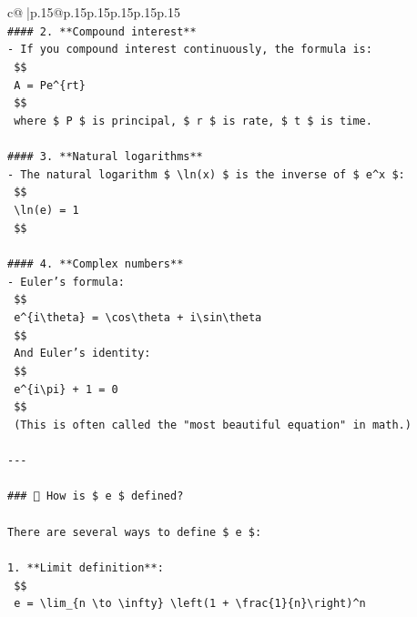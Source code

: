 \documentclass{article}
\begin{document}
{\begin{supertabular}{c@{$\;$}|p{.15\linewidth}@{}p{.15\linewidth}p{.15\linewidth}p{.15\linewidth}p{.15\linewidth}p{.15\linewidth}}
{{{\\ 
\texttt{\#\#\#\# 2. **Compound interest**} \\
\texttt{{-} If you compound interest continuously, the formula is:} \\
\texttt{  \$\$} \\
\texttt{  A = Pe\^{}\{rt\}} \\
\texttt{  \$\$} \\
\texttt{  where \$ P \$ is principal, \$ r \$ is rate, \$ t \$ is time.} \\
\\ 
\texttt{\#\#\#\# 3. **Natural logarithms**} \\
\texttt{{-} The natural logarithm \$ \textbackslash{}ln(x) \$ is the inverse of \$ e\^{}x \$:} \\
\texttt{  \$\$} \\
\texttt{  \textbackslash{}ln(e) = 1} \\
\texttt{  \$\$} \\
\\ 
\texttt{\#\#\#\# 4. **Complex numbers**} \\
\texttt{{-} Euler's formula:} \\
\texttt{  \$\$} \\
\texttt{  e\^{}\{i\textbackslash{}theta\} = \textbackslash{}cos\textbackslash{}theta + i\textbackslash{}sin\textbackslash{}theta} \\
\texttt{  \$\$} \\
\texttt{  And Euler's identity:} \\
\texttt{  \$\$} \\
\texttt{  e\^{}\{i\textbackslash{}pi\} + 1 = 0} \\
\texttt{  \$\$} \\
\texttt{  (This is often called the "most beautiful equation" in math.)} \\
\\ 
\texttt{{-}{-}{-}} \\
\\ 
\texttt{\#\#\# 🔹 How is \$ e \$ defined?} \\
\\ 
\texttt{There are several ways to define \$ e \$:} \\
\\ 
\texttt{1. **Limit definition**:} \\
\texttt{   \$\$} \\
\texttt{   e = \textbackslash{}lim\_\{n \textbackslash{}to \textbackslash{}infty\} \textbackslash{}left(1 + \textbackslash{}frac\{1\}\{n\}\textbackslash{}right)\^{}n} \\
}}}
\end{supertabular}}
\end{document}
